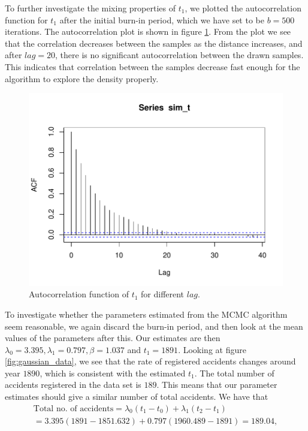 To further investigate the mixing properties of $t_1$, we plotted the autocorrelation function for $t_1$ after the initial burn-in period, which we have set to be $b = 500$ iterations. The autocorrelation plot is shown in figure \ref{fig:acf_t}. From the plot we see that the correlation decreases between the samples as the distance increases, and after $lag = 20$, there is no significant autocorrelation between the drawn samples. This indicates that correlation between the samples decrease fast enough for the algorithm to explore the density properly. 

\begin{figure}[h!]
    \centering
    \includegraphics[width = \textwidth]{Images/acf_t_10000.pdf}
    \caption{Autocorrelation function of $t_1$ for different $lag$. }
    \label{fig:acf_t}
\end{figure}


To investigate whether the parameters estimated from the MCMC algorithm seem reasonable, we again discard the burn-in period, and then look at the mean values of the parameters after this. Our estimates are then $\lambda_0 = 3.395, \lambda_1 = 0.797 , \beta = 1.037 $ and $t_1 = 1891$. Looking at figure \ref{fig:gaussian_data}, we see that the rate of registered accidents changes around year $1890$, which is consistent with the estimated $t_1$. The total number of accidents registered in the data set is $189$. This means that our parameter estimates should give a similar number of total accidents. We have that
\begin{align}
    \text{Total no. of accidents} = \lambda_0(t_1 - t_0) + \lambda_1(t_2 - t_1) \nonumber \\
    = 3.395(1891-1851.632) + 0.797(1960.489 - 1891) = 189.04, 
\end{align}


